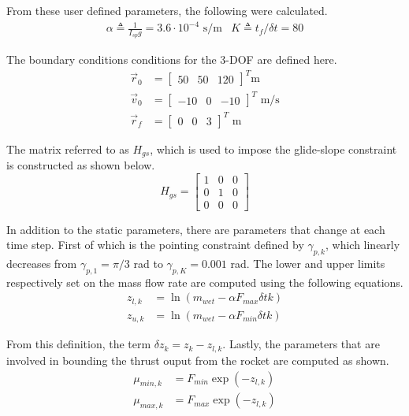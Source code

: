 \documentclass[conference]{IEEEtran}
\begin{document}
From these user defined parameters, the following were calculated.
\begin{eqnarray*}
    \alpha \triangleq \frac{1}{I_{sp} g} = 3.6 \cdot 10^{-4} \text{ s/m} & K \triangleq t_f/\delta t = 80
\end{eqnarray*}

The boundary conditions conditions for the 3-DOF are defined here.
\begin{align*}
    \vec{r}_0 &= \begin{bmatrix} 50 & 50 & 120 \end{bmatrix}^T \text{m} \\ 
    \vec{v}_0 &= \begin{bmatrix} -10 & 0 & -10 \end{bmatrix}^T \text{ m/s} \\ 
    \vec{r}_f &= \begin{bmatrix} 0 & 0 & 3 \end{bmatrix}^T \text{ m}
\end{align*}

The matrix referred to as $H_{gs}$, which is used to impose the glide-slope constraint is constructed as shown below.
\begin{equation*}
    H_{gs} = \begin{bmatrix}
        1 & 0 & 0 \\ 0 & 1 & 0 \\ 0 & 0 & 0
    \end{bmatrix}
\end{equation*}

In addition to the static parameters, there are parameters that change at each time step. 
First of which is the pointing constraint defined by $\gamma_{p,k}$, which linearly decreases from $\gamma_{p,1} = \pi/3$ rad to $\gamma_{p,K} = 0.001$ rad.
The lower and upper limits respectively set on the mass flow rate are computed using the following equations.
\begin{align*}
    z_{l,k} & = \ln{(m_{wet} - \alpha F_{max} \delta t k)} \\
    z_{u,k} & = \ln{(m_{wet} - \alpha F_{min} \delta t k)}
\end{align*}

From this definition, the term $\delta z_k = z_k - z_{l,k}$.
Lastly, the parameters that are involved in bounding the thrust ouput from the rocket are computed as shown.
\begin{align*}
    \mu_{min,k} & = F_{min} \exp{(-z_{l,k})} \\
    \mu_{max,k} & = F_{max} \exp{(-z_{l,k})}
\end{align*}
\end{document}
